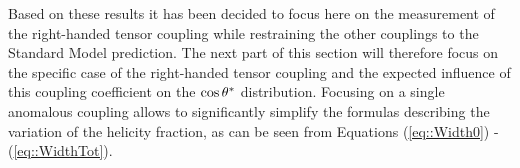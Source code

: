 Based on these results it has been decided to focus here on the measurement of the right-handed tensor coupling while restraining the other couplings to the Standard Model prediction.
The next part of this section will therefore focus on the specific case of the right-handed tensor coupling and the expected influence of this coupling coefficient on the $\cos \theta^{*}$ distribution.
Focusing on a single anomalous coupling allows to significantly simplify the formulas describing the variation of the helicity fraction, as can be seen from Equations (\ref{eq::Width0}) - (\ref{eq::WidthTot}). %
